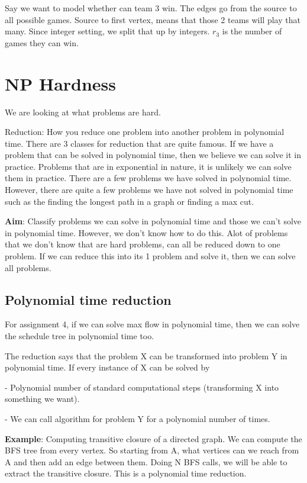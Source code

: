 \documentclass[11pt, oneside]{article}
\theoremstyle{definition}
\begin{document}
Say we want to model whether can team 3 win. The edges go from the source to all possible games. Source to first vertex, means that those 2 teams will play that many. Since integer setting, we split that up by integers. $r_3$ is the number of games they can win.

\newpage
\section{NP Hardness}
We are looking at what problems are hard.

Reduction: How you reduce one problem into another problem in polynomial time. There are 3 classes for reduction that are quite famous. If we have a problem that can be solved in polynomial time, then we believe we can solve it in practice. Problems that are in exponential in nature, it is unlikely we can solve them in practice. There are a few problems we have solved in polynomial time. However, there are quite a few problems we have not solved in polynomial time such as the finding the longest path in a graph or finding a max cut.

\textbf{Aim}: Classify problems we can solve in polynomial time and those we can't solve in polynomial time. However, we don't know how to do this. Alot of problems that we don't know that are hard problems, can all be reduced down to one problem. If we can reduce this into its 1 problem and solve it, then we can solve all problems.

\subsection{Polynomial time reduction}
For assignment 4, if we can solve max flow in polynomial time, then we can solve the schedule tree in polynomial time too.

The reduction says that the problem X can be transformed into problem Y in polynomial time. If every instance of X can be solved by

- Polynomial number of standard computational steps (transforming X into something we want).

- We can call algorithm for problem Y for a polynomial number of times.

\textbf{Example}: Computing transitive closure of a directed graph. We can compute the BFS tree from every vertex. So starting from A, what vertices can we reach from A and then add an edge between them. Doing N BFS calls, we will be able to extract the transitive closure. This is a polynomial time reduction.
\end{document}
